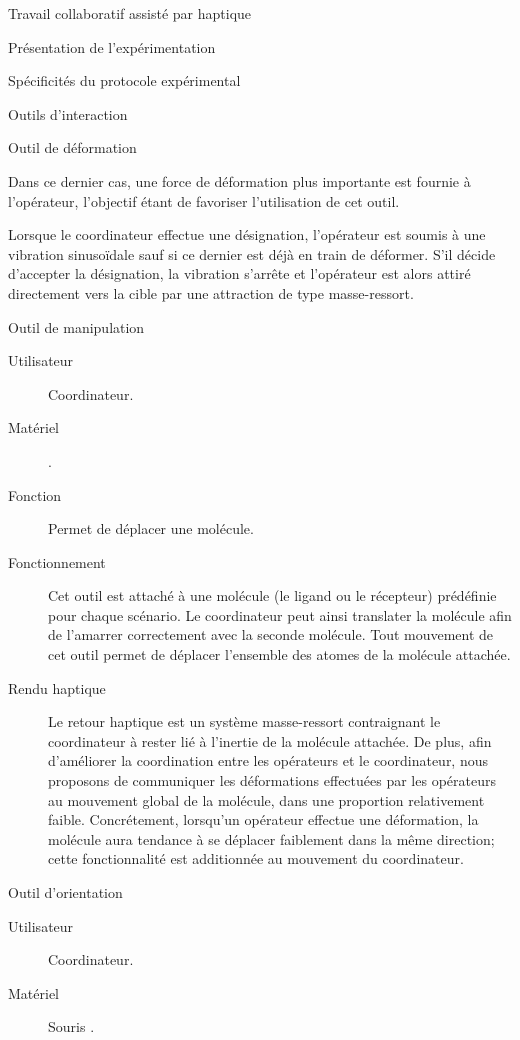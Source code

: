 \documentclass[myfrancais,ngerman,english,french]{mythesis}
\begin{document}
\begin{mychapter}{Travail collaboratif assisté par haptique}
\begin{mysection}{Présentation de l'expérimentation}
\begin{mysubsection}{Spécificités du protocole expérimental}
\begin{mysubsubsection}{Outils d'interaction}
\begin{myparagraph}{Outil de déformation}
\begin{description}
								Dans ce dernier cas, une force de déformation plus importante est fournie à l'opérateur, l'objectif étant de favoriser l'utilisation de cet outil.
							\item[Rendu haptique]
								Lorsque le coordinateur effectue une désignation, l'opérateur est soumis à une vibration sinusoïdale sauf si ce dernier est déjà en train de déformer.
								S'il décide d'accepter la désignation, la vibration s'arrête et l'opérateur est alors attiré directement vers la cible par une attraction de type masse-ressort.
						\end{description}
					\end{myparagraph}
					\begin{myparagraph}{Outil de manipulation}
						\begin{description}
							\item[Utilisateur] Coordinateur.
							\item[Matériel] \myDesktop.
							\item[Fonction] Permet de déplacer une molécule.
							\item[Fonctionnement]
								Cet outil est attaché à une molécule (le ligand ou le récepteur) prédéfinie pour chaque scénario.
								Le coordinateur peut ainsi translater la molécule afin de l'amarrer correctement avec la seconde molécule.
								Tout mouvement de cet outil permet de déplacer l'ensemble des atomes de la molécule attachée.
							\item[Rendu haptique]
								Le retour haptique est un système masse-ressort contraignant le coordinateur à rester lié à l'inertie de la molécule attachée.
								De plus, afin d'améliorer la coordination entre les opérateurs et le coordinateur, nous proposons de communiquer les déformations effectuées par les opérateurs au mouvement global de la molécule, dans une proportion relativement faible.
								Concrétement, lorsqu'un opérateur effectue une déformation, la molécule aura tendance à se déplacer faiblement dans la même direction; cette fonctionnalité est additionnée au mouvement du coordinateur.
						\end{description}
					\end{myparagraph}
					\begin{myparagraph}{Outil d'orientation}
						\begin{description}
							\item[Utilisateur] Coordinateur.
							\item[Matériel] Souris \myUSB.

\end{description}
\end{myparagraph}
\end{mysubsubsection}
\end{mysubsection}
\end{mysection}
\end{mychapter}
\end{document}
